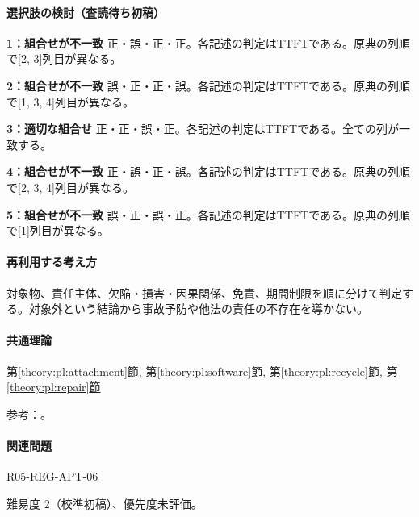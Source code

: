 \paragraph{選択肢の検討（査読待ち初稿）}\mbox{}\par

\noindent\textbf{1：組合せが不一致} 正・誤・正・正。各記述の判定はTTFTである。原典の列順で[2, 3]列目が異なる。\par

\noindent\textbf{2：組合せが不一致} 誤・正・正・誤。各記述の判定はTTFTである。原典の列順で[1, 3, 4]列目が異なる。\par

\noindent\textbf{3：適切な組合せ} 正・正・誤・正。各記述の判定はTTFTである。全ての列が一致する。\par

\noindent\textbf{4：組合せが不一致} 正・誤・正・誤。各記述の判定はTTFTである。原典の列順で[2, 3, 4]列目が異なる。\par

\noindent\textbf{5：組合せが不一致} 誤・正・誤・正。各記述の判定はTTFTである。原典の列順で[1]列目が異なる。\par

\paragraph{再利用する考え方} 対象物、責任主体、欠陥・損害・因果関係、免責、期間制限を順に分けて判定する。対象外という結論から事故予防や他法の責任の不存在を導かない。

\paragraph{共通理論} \hyperref[theory:pl:attachment]{第\ref*{theory:pl:attachment}節}, \hyperref[theory:pl:software]{第\ref*{theory:pl:software}節}, \hyperref[theory:pl:recycle]{第\ref*{theory:pl:recycle}節}, \hyperref[theory:pl:repair]{第\ref*{theory:pl:repair}節}

\par 参考：\cite{pl_statute,pl_qa,pl_definitions2018}。

\paragraph{関連問題} \hyperref[q:r05-reg-apt-06]{R05-REG-APT-06}

\par 難易度 2（校準初稿）、優先度未評価。

